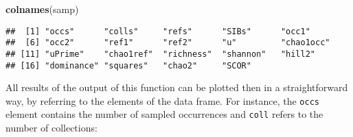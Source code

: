 \documentclass[]{article}
\newenvironment{Shaded}{\begin{snugshade}}{\end{snugshade}}
\newcommand{\KeywordTok}[1]{\textcolor[rgb]{0.13,0.29,0.53}{\textbf{{#1}}}}
\newcommand{\DataTypeTok}[1]{\textcolor[rgb]{0.13,0.29,0.53}{{#1}}}
\newcommand{\DecValTok}[1]{\textcolor[rgb]{0.00,0.00,0.81}{{#1}}}
\newcommand{\StringTok}[1]{\textcolor[rgb]{0.31,0.60,0.02}{{#1}}}
\newcommand{\CommentTok}[1]{\textcolor[rgb]{0.56,0.35,0.01}{\textit{{#1}}}}
\newcommand{\NormalTok}[1]{{#1}}
\begin{document}
\begin{Shaded}
\begin{Highlighting}[]
\KeywordTok{colnames}\NormalTok{(samp)}
\end{Highlighting}
\end{Shaded}

\begin{verbatim}
##  [1] "occs"      "colls"     "refs"      "SIBs"      "occ1"     
##  [6] "occ2"      "ref1"      "ref2"      "u"         "chao1occ" 
## [11] "uPrime"    "chao1ref"  "richness"  "shannon"   "hill2"    
## [16] "dominance" "squares"   "chao2"     "SCOR"
\end{verbatim}

All results of the output of this function can be plotted then in a
straightforward way, by referring to the elements of the data frame. For
instance, the \texttt{occs} element contains the number of sampled
occurrences and \texttt{coll} refers to the number of collections:

\begin{Shaded}
\end{Shaded}
\end{document}
